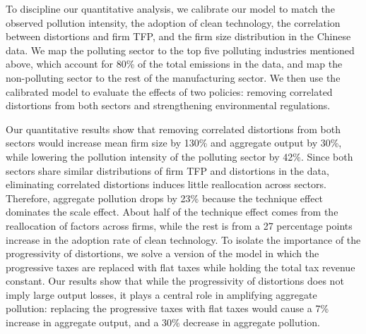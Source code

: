\documentclass[AEJ]{AEA}
\begin{document}
To discipline our quantitative analysis, we calibrate our model to match the observed pollution intensity, the adoption of clean technology, the correlation between distortions and firm TFP, and the firm size distribution in the Chinese data. We map the polluting sector to the top five polluting industries mentioned above, which account for 80\% of the total emissions in the data, and map the non-polluting sector to the rest of the manufacturing sector. We then use the calibrated model to evaluate the effects of two policies: removing correlated distortions from both sectors and strengthening environmental regulations.%

Our quantitative results show that removing correlated distortions from both sectors would increase mean firm size by 130\% and aggregate output by 30\%, while lowering the pollution intensity of the polluting sector by 42\%. Since both sectors share similar distributions of firm TFP and distortions in the data, eliminating correlated distortions induces little reallocation across sectors. Therefore, aggregate pollution drops by 23\% because the technique effect dominates the scale effect. About half of the technique effect comes from the reallocation of factors across firms, while the rest is from a 27 percentage points increase in the adoption rate of clean technology. To isolate the importance of the progressivity of distortions, we solve a version of the model in which the progressive taxes are replaced with flat taxes while holding the total tax revenue constant. Our results show that while the progressivity of distortions does not imply large output losses, it plays a central role in amplifying aggregate pollution: replacing the progressive taxes with flat taxes would cause a 7\% increase in aggregate output, and a 30\% decrease in aggregate pollution.
\end{document}
